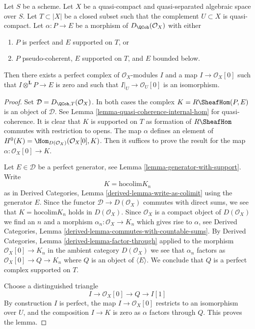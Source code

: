 \begin{lemma}
\label{lemma-map-from-pseudo-coherent-to-complex-with-support}
Let $S$ be a scheme. Let $X$ be a quasi-compact and quasi-separated
algebraic space over $S$. Let $T \subset |X|$
be a closed subset such that the complement $U \subset X$ is quasi-compact.
Let $\alpha : P \to E$ be a morphism of $D_\QCoh(\mathcal{O}_X)$ with
either
\begin{enumerate}
\item $P$ is perfect and $E$ supported on $T$, or
\item $P$ pseudo-coherent, $E$ supported on $T$, and $E$ bounded below.
\end{enumerate}
Then there exists a perfect complex of $\mathcal{O}_X$-modules $I$
and a map $I \to \mathcal{O}_X[0]$ such that
$I \otimes^\mathbf{L} P \to E$ is zero and such that
$I|_U \to \mathcal{O}_U[0]$ is an
isomorphism.
\end{lemma}

\begin{proof}
Set $\mathcal{D} = D_{\QCoh, T}(\mathcal{O}_X)$. In both cases the complex
$K = R\SheafHom(P, E)$ is an object of $\mathcal{D}$. See
Lemma \ref{lemma-quasi-coherence-internal-hom} for quasi-coherence.
It is clear that $K$ is supported on $T$ as formation of $R\SheafHom$
commutes with restriction to opens.
The map $\alpha$ defines an element of
$H^0(K) = \Hom_{D(\mathcal{O}_X)}(\mathcal{O}_X[0], K)$.
Then it suffices to prove the result for the map
$\alpha : \mathcal{O}_X[0] \to K$.

\medskip\noindent
Let $E \in \mathcal{D}$ be a perfect generator, see
Lemma \ref{lemma-generator-with-support}. Write
$$
K = \text{hocolim} K_n
$$
as in Derived Categories, Lemma \ref{derived-lemma-write-as-colimit}
using the generator $E$. Since the functor $\mathcal{D} \to D(\mathcal{O}_X)$
commutes with direct sums, we see that $K = \text{hocolim} K_n$
holds in $D(\mathcal{O}_X)$. Since $\mathcal{O}_X$ is a compact
object of $D(\mathcal{O}_X)$ we find an $n$ and a morphism
$\alpha_n : \mathcal{O}_X \to K_n$ which gives rise to $\alpha$, see
Derived Categories, Lemma \ref{derived-lemma-commutes-with-countable-sums}.
By Derived Categories, Lemma \ref{derived-lemma-factor-through}
applied to the morphism $\mathcal{O}_X[0] \to K_n$ in the ambient
category $D(\mathcal{O}_X)$ we see that $\alpha_n$ factors as
$\mathcal{O}_X[0] \to Q \to K_n$ where $Q$ is an object
of $\langle E \rangle$. We conclude that $Q$ is a perfect complex
supported on $T$.

\medskip\noindent
Choose a distinguished triangle
$$
I \to \mathcal{O}_X[0] \to Q \to I[1]
$$
By construction $I$ is perfect, the map $I \to \mathcal{O}_X[0]$
restricts to an isomorphism over $U$, and the composition
$I \to K$ is zero as $\alpha$ factors through $Q$.
This proves the lemma.
\end{proof}










